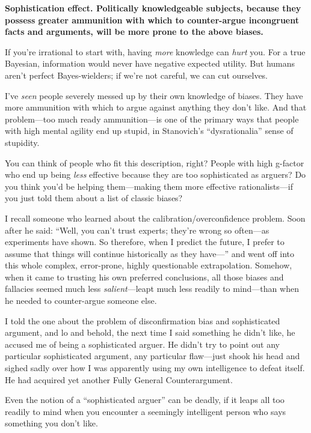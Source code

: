 {
 \textbf{Sophistication effect. Politically knowledgeable subjects,
because they possess greater ammunition with which to counter-argue
incongruent facts and arguments, will be more prone to the above
biases.}}

{
 If you're irrational to start with, having
\textit{more} knowledge can \textit{hurt} you. For a true Bayesian,
information would never have negative expected utility. But humans
aren't perfect Bayes-wielders; if we're
not careful, we can cut ourselves.}

{
 I've \textit{seen} people severely messed up by
their own knowledge of biases. They have more ammunition with which to
argue against anything they don't like. And that
problem---too much ready ammunition---is one of the primary ways that
people with high mental agility end up stupid, in
Stanovich's
``dysrationalia'' sense of
stupidity.}

{
 You can think of people who fit this description, right? People
with high g-factor who end up being \textit{less} effective because
they are too sophisticated as arguers? Do you think
you'd be helping them---making them more effective
rationalists---if you just told them about a list of classic biases?}

{
 I recall someone who learned about the calibration/overconfidence
problem. Soon after he said: ``Well, you
can't trust experts; they're wrong so
often---as experiments have shown. So therefore, when I predict the
future, I prefer to assume that things will continue historically as
they have---'' and went off into this whole complex,
error-prone, highly questionable extrapolation. Somehow, when it came
to trusting his own preferred conclusions, all those biases and
fallacies seemed much less \textit{salient}{}---leapt much less readily
to mind---than when he needed to counter-argue someone else.}

{
 I told the one about the problem of disconfirmation bias and
sophisticated argument, and lo and behold, the next time I said
something he didn't like, he accused me of being a
sophisticated arguer. He didn't try to point out any
particular sophisticated argument, any particular flaw---just shook his
head and sighed sadly over how I was apparently using my own
intelligence to defeat itself. He had acquired yet another Fully
General Counterargument.}

{
 Even the notion of a ``sophisticated
arguer'' can be deadly, if it leaps all too readily
to mind when you encounter a seemingly intelligent person who says
something you don't like.}

